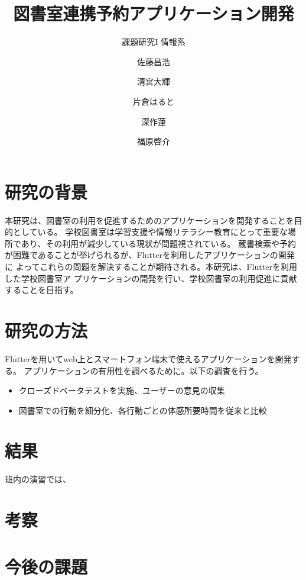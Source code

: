 \documentclass[pdflatex,ja=standard,twocolumn]{bxjsarticle}
\begin{document}
\title{図書室連携予約アプリケーション開発}
\author{課題研究I 情報系\and 佐藤昌浩 \and 清宮大輝 \and 片倉はると \and 深作蓮 \and 福原啓介}
\date{\vspace{-10mm}}


\section{研究の背景}
本研究は、図書室の利用を促進するためのアプリケーションを開発することを目的としている。
学校図書室は学習支援や情報リテラシー教育にとって重要な場所であり、その利用が減少している現状が問題視されている。
蔵書検索や予約が困難であることが挙げられるが、Flutterを利用したアプリケーションの開発に
よってこれらの問題を解決することが期待される。本研究は、Flutterを利用した学校図書室ア
プリケーションの開発を行い、学校図書室の利用促進に貢献することを目指す。
\section{研究の方法}
Flutterを用いてweb上とスマートフォン端末で使えるアプリケーションを開発する。
アプリケーションの有用性を調べるために。以下の調査を行う。
\begin{itemize}
  \item クローズドベータテストを実施、ユーザーの意見の収集
  \item 図書室での行動を細分化、各行動ごとの体感所要時間を従来と比較
\end{itemize}
\section{結果}
班内の演習では、
\section{考察}
\section{今後の課題}
\end{document}
